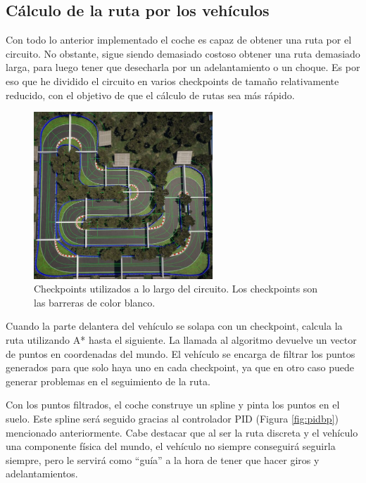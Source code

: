 \newpage

\subsection{Cálculo de la ruta por los vehículos}

Con todo lo anterior implementado el coche es capaz de obtener una ruta por el circuito. No obstante, sigue siendo demasiado costoso obtener una ruta demasiado larga, para luego tener que desecharla por un adelantamiento o un choque. Es por eso que he dividido el circuito en varios checkpoints de tamaño relativamente reducido, con el objetivo de que el cálculo de rutas sea más rápido.


\begin{figure}[H]
    \centering
    \includegraphics[width=0.6\textwidth]{imagenes/converted/checkpoints.jpg}
    \caption{Checkpoints utilizados a lo largo del circuito. Los checkpoints son las barreras de color blanco.}
    \label{fig:checkpointunreal}
\end{figure}

Cuando la parte delantera del vehículo se solapa con un checkpoint, calcula la ruta utilizando A* hasta el siguiente. La llamada al algoritmo devuelve un vector de puntos en coordenadas del mundo. El vehículo se encarga de filtrar los puntos generados para que solo haya uno en cada checkpoint, ya que en otro caso puede generar problemas en el seguimiento de la ruta.

\bigskip

Con los puntos filtrados, el coche construye un spline y pinta los puntos en el suelo. Este spline será seguido gracias al controlador PID (Figura \ref{fig:pidbp}) mencionado anteriormente. Cabe destacar que al ser la ruta discreta y el vehículo una componente física del mundo, el vehículo no siempre conseguirá seguirla siempre, pero le servirá como ``guía'' a la hora de tener que hacer giros y adelantamientos.

